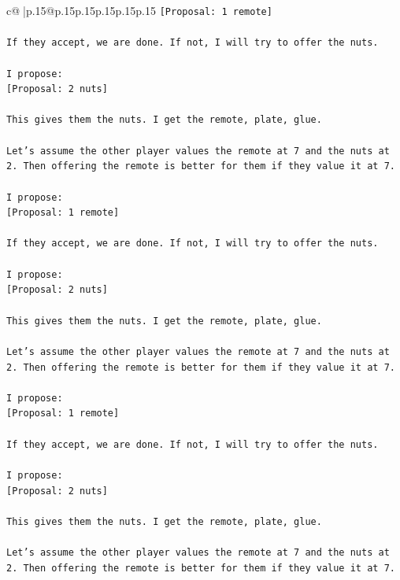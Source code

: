 \documentclass{article}
\begin{document}
{\begin{supertabular}{c@{$\;$}|p{.15\linewidth}@{}p{.15\linewidth}p{.15\linewidth}p{.15\linewidth}p{.15\linewidth}p{.15\linewidth}}
{{{\texttt{{[}Proposal: 1 remote{]}} \\
\\ 
\texttt{If they accept, we are done. If not, I will try to offer the nuts.} \\
\\ 
\texttt{I propose:} \\
\texttt{{[}Proposal: 2 nuts{]}} \\
\\ 
\texttt{This gives them the nuts. I get the remote, plate, glue.} \\
\\ 
\texttt{Let's assume the other player values the remote at 7 and the nuts at 2. Then offering the remote is better for them if they value it at 7.} \\
\\ 
\texttt{I propose:} \\
\texttt{{[}Proposal: 1 remote{]}} \\
\\ 
\texttt{If they accept, we are done. If not, I will try to offer the nuts.} \\
\\ 
\texttt{I propose:} \\
\texttt{{[}Proposal: 2 nuts{]}} \\
\\ 
\texttt{This gives them the nuts. I get the remote, plate, glue.} \\
\\ 
\texttt{Let's assume the other player values the remote at 7 and the nuts at 2. Then offering the remote is better for them if they value it at 7.} \\
\\ 
\texttt{I propose:} \\
\texttt{{[}Proposal: 1 remote{]}} \\
\\ 
\texttt{If they accept, we are done. If not, I will try to offer the nuts.} \\
\\ 
\texttt{I propose:} \\
\texttt{{[}Proposal: 2 nuts{]}} \\
\\ 
\texttt{This gives them the nuts. I get the remote, plate, glue.} \\
\\ 
\texttt{Let's assume the other player values the remote at 7 and the nuts at 2. Then offering the remote is better for them if they value it at 7.} \\
}}}
\end{supertabular}}
\end{document}
